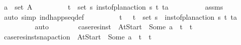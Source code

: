 \begin{isabellebody}
\ {\isachardoublequoteopen}a\ {\isasymin}\ set\ A{\isachardoublequoteclose}\isanewline
\ \ \ \ \ \ \isamarkupfalse%
\ \isamarkupfalse%
\ {\isachardoublequoteopen}{\isasymexists}{\isacharparenleft}{\kern0pt}t\isactrlsub {\isasympi}{\isacharcomma}{\kern0pt}{\isasympi}{\isacharparenright}{\kern0pt}\ {\isasymin}\ set\ {\isasympi}s{\isachardot}{\kern0pt}\ inst{\isacharunderscore}{\kern0pt}of{\isacharunderscore}{\kern0pt}plan{\isacharunderscore}{\kern0pt}action\ {\isasympi}s\ {\isacharparenleft}{\kern0pt}t\isactrlsub {\isasympi}{\isacharcomma}{\kern0pt}{\isasympi}{\isacharparenright}{\kern0pt}\ {\isacharparenleft}{\kern0pt}t{\isacharcomma}{\kern0pt}a{\isacharparenright}{\kern0pt}{\isachardoublequoteclose}\isanewline
\ \ \ \ \ \ \ \ \isamarkupfalse%
\ assms\ \isamarkupfalse%
\ {\isacharparenleft}{\kern0pt}auto\ simp{\isacharcolon}{\kern0pt}\ ind{\isacharunderscore}{\kern0pt}happ{\isacharunderscore}{\kern0pt}seq{\isacharunderscore}{\kern0pt}def{\isacharparenright}{\kern0pt}\isanewline
\ \ \ \ \ \ \isamarkupfalse%
\ \isamarkupfalse%
\ t\isactrlsub {\isasympi}\ {\isasympi}\ \ {\isachardoublequoteopen}{\isacharparenleft}{\kern0pt}t\isactrlsub {\isasympi}{\isacharcomma}{\kern0pt}{\isasympi}{\isacharparenright}{\kern0pt}\ {\isasymin}\ set\ {\isasympi}s{\isachardoublequoteclose}\ \ {\isachardoublequoteopen}inst{\isacharunderscore}{\kern0pt}of{\isacharunderscore}{\kern0pt}plan{\isacharunderscore}{\kern0pt}action\ {\isasympi}s\ {\isacharparenleft}{\kern0pt}t\isactrlsub {\isasympi}{\isacharcomma}{\kern0pt}{\isasympi}{\isacharparenright}{\kern0pt}\ {\isacharparenleft}{\kern0pt}t{\isacharcomma}{\kern0pt}a{\isacharparenright}{\kern0pt}{\isachardoublequoteclose}\isanewline
\ \ \ \ \ \ \ \ \isamarkupfalse%
\ auto\isanewline
\ \ \ \ \ \ \isamarkupfalse%
\ {\isacharquery}{\kern0pt}case{}{\isacharequal}{\kern0pt}{\isachardoublequoteopen}res{\isacharunderscore}{\kern0pt}inst\ {\isasympi}\ At{\isacharunderscore}{\kern0pt}Start\ {\isacharequal}{\kern0pt}\ Some\ a\ {\isasymand}\ t\isactrlsub {\isasympi}\ {\isacharequal}{\kern0pt}\ t{\isachardoublequoteclose}\isanewline
\ \ \ \ \ \ \isamarkupfalse%
\ {\isacharquery}{\kern0pt}case{}{\isacharequal}{\kern0pt}{\isachardoublequoteopen}res{\isacharunderscore}{\kern0pt}inst{\isacharunderscore}{\kern0pt}snap{\isacharunderscore}{\kern0pt}action\ {\isasympi}\ At{\isacharunderscore}{\kern0pt}Start\ {\isacharequal}{\kern0pt}\ Some\ a\ {\isasymand}\ t\isactrlsub {\isasympi}\ {\isacharequal}{\kern0pt}\ t{\isachardoublequoteclose}\isanewline

\end{isabellebody}
